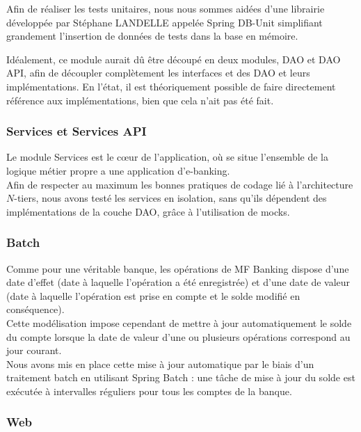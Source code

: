 Afin de réaliser les tests unitaires, nous nous sommes aidées d'une librairie développée par Stéphane LANDELLE appelée Spring DB-Unit simplifiant grandement l'insertion de données de tests dans la base en mémoire. 

Idéalement, ce module aurait dû être découpé en deux modules, DAO et DAO API, afin de découpler complètement les interfaces et des DAO et leurs implémentations. En l'état, il est théoriquement possible de faire directement référence aux implémentations, bien que cela n'ait pas été fait.\\
 
\subsubsection*{Services et Services API}

Le module Services est le cœur de l'application, où se situe l'ensemble de la logique métier propre a une application d'e-banking.\\

Afin de respecter au maximum les bonnes pratiques de codage lié à l'architecture $N$-tiers, nous avons testé les services en isolation, sans qu'ils dépendent des implémentations de la couche DAO, grâce à l'utilisation de mocks.\\

\subsubsection*{Batch}

Comme pour une véritable banque, les opérations de MF Banking dispose d'une date d'effet (date à laquelle l'opération a été enregistrée) et d'une date de valeur (date à laquelle l'opération est prise en compte et le solde modifié en conséquence).\\

Cette modélisation impose cependant de mettre à jour automatiquement le solde du compte lorsque la date de valeur d'une ou plusieurs opérations correspond au jour courant.\\
Nous avons mis en place cette mise à jour automatique par le biais d'un traitement batch en utilisant Spring Batch : une tâche de mise à jour du solde est exécutée à intervalles réguliers pour tous les comptes de la banque.\\

\subsubsection*{Web}

